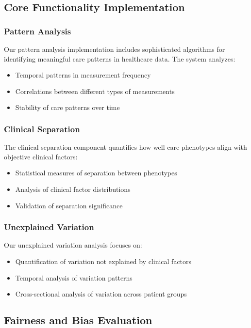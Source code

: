 \documentclass[12pt]{article}
\begin{document}
\subsection{Core Functionality Implementation}

\subsubsection{Pattern Analysis}

Our pattern analysis implementation includes sophisticated algorithms for identifying meaningful care patterns in healthcare data. The system analyzes:
\begin{itemize}
    \item Temporal patterns in measurement frequency
    \item Correlations between different types of measurements
    \item Stability of care patterns over time
\end{itemize}

\subsubsection{Clinical Separation}

The clinical separation component quantifies how well care phenotypes align with objective clinical factors:
\begin{itemize}
    \item Statistical measures of separation between phenotypes
    \item Analysis of clinical factor distributions
    \item Validation of separation significance
\end{itemize}

\subsubsection{Unexplained Variation}

Our unexplained variation analysis focuses on:
\begin{itemize}
    \item Quantification of variation not explained by clinical factors
    \item Temporal analysis of variation patterns
    \item Cross-sectional analysis of variation across patient groups
\end{itemize}

\subsection{Fairness and Bias Evaluation}
\end{document}
